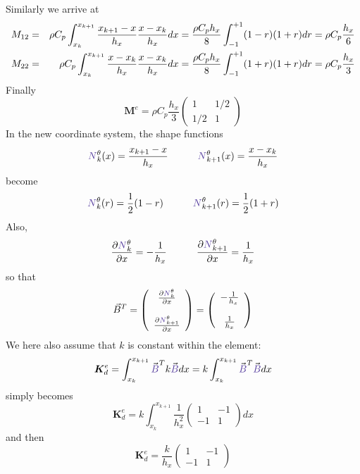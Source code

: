Similarly we arrive at 
\begin{eqnarray}
M_{12}
&=&\rho C_p 
\int_{x_k}^{x_{k+1}} 
\frac{x_{k+1}-x}{h_x}  
\frac{x-x_k}{h_x}  
dx
=
\frac{\rho C_p  h_x}{8} 
\int_{-1}^{+1} (1-r) (1+r)dr
= \rho C_p\frac{h_x}{6}  \nonumber\\
M_{22}
&=&
\rho C_p 
\int_{x_k}^{x_{k+1}} 
\frac{x-x_k}{h_x}  
\frac{x-x_k}{h_x}  
dx
=
\frac{\rho C_p  h_x}{8} 
\int_{-1}^{+1} (1+r) (1+r)dr
= \rho C_p \frac{h_x}{3} \nonumber 
\end{eqnarray}
Finally 
\[
\boxed{
{\bm M}^e= \rho C_p \frac{h_x}{3}   
\left(
\begin{array}{cc}
1  & 1/2 \\
1/2 & 1
\end{array}
\right)
}
\]
In the new coordinate system, the {\color{olive}shape functions} 
\[
{\color{Violet}N}_k^\theta(x) = \frac{x_{k+1}-x}{h_x} 
\quad
\quad
\quad
{\color{Violet}N}_{k+1}^\theta(x) = \frac{x-x_k}{h_x} 
\]
become 
\[
{\color{Violet}N}_k^\theta(r) = \frac{1}{2} (1-r)
\quad
\quad
\quad
{\color{Violet}N}_{k+1}^\theta(r) = \frac{1}{2} (1+r)
\]
Also, 
\[
\frac{\partial {\color{Violet}N}_k^\theta}{\partial x} = - \frac{1}{h_x} 
\quad
\quad
\quad
\frac{\partial {\color{Violet}N}_{k+1}^\theta}{\partial x} = \frac{1}{h_x} 
\]
so that 
\[
{\vec B}^T=
\left(
\begin{array}{cc}
 \frac{\partial {\color{Violet}N}_k^\theta}{\partial x}   \\ \\
 \frac{\partial {\color{Violet}N}_{k+1}^\theta}{\partial x}
\end{array}
\right)
=
\left(
\begin{array}{cc}
-\frac{1}{h_x} \\ \\
\frac{1}{h_x} 
\end{array}
\right)
\]
We here also assume that $k$ is constant within the element:
\[
{\bm K}_d^e =
\int_{x_k}^{x_{k+1}}   {\vec {\color{Violet}B}}^T k {\vec {\color{Violet}B}} dx 
= k \int_{x_k}^{x_{k+1}}   {\vec {\color{Violet}B}}^T {\vec {\color{Violet}B}} dx 
\]
simply becomes
\[
{\bm K}_d^e = k
 \int_{x_k}^{x_{k+1}} 
\frac{1}{h_x^2}
\left(
\begin{array}{cc}
1 & -1 \\ -1 & 1
\end{array}
\right)
dx
\]
and then
\[
\boxed{
{\bm K}_d^e =
\frac{k}{h_x}
\left(
\begin{array}{cc}
1 & -1 \\ -1 & 1
\end{array}
\right)
}
\]

